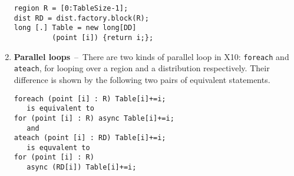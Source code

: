 \begin{enumerate}
\begin{center}
{\small
\begin{verbatim}
region R = [0:TableSize-1];
dist RD = dist.factory.block(R);
long [.] Table = new long[DD] 
         (point [i]) {return i;};
\end{verbatim}
}
\end{center}

\item{\bf Parallel loops}~--~There are two kinds of parallel loop in X10: {\tt foreach} and {\tt ateach}, for looping over a region and a distribution respectively. Their difference is shown by the following two pairs of equivalent statements.

\begin{center}
{\small
\begin{verbatim}
foreach (point [i] : R) Table[i]+=i; 
   is equivalent to 
for (point [i] : R) async Table[i]+=i;
   and
ateach (point [i] : RD) Table[i]+=i; 
   is equvalent to 
for (point [i] : R) 
   async (RD[i]) Table[i]+=i;
\end{verbatim}
}
\end{center} 


\end{enumerate}

